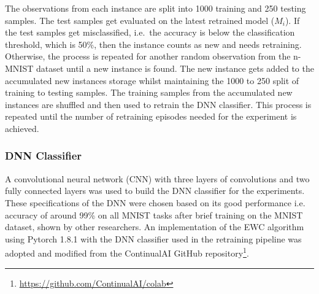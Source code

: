 The observations from each instance are split into 1000 training and 250 testing samples.
%
The test samples get evaluated on the latest retrained model ($M_i$).
%
If the test samples get misclassified, i.e.\ the accuracy is below the classification threshold, which is 50\%, then the instance counts as new and needs retraining. 
%
Otherwise, the process is repeated for another random observation from the n-MNIST dataset until a new instance is found.
%
The new instance gets added to the accumulated new instances storage whilst maintaining the 1000 to 250 split of training to testing samples. The training samples from the accumulated new instances are shuffled and then used to retrain the DNN classifier.
%
This process is repeated until the number of retraining episodes needed for the experiment is achieved.

\subsubsection{DNN Classifier}
A convolutional neural network (CNN) with three layers of convolutions and two fully connected layers was used to build the DNN classifier for the experiments. 
%
%
These specifications of the DNN were chosen based on its good performance i.e. accuracy of around 99\% on all MNIST tasks after brief training on the MNIST dataset, shown by other researchers.%
%
An implementation of the EWC algorithm using Pytorch 1.8.1 with the DNN classifier used in the retraining pipeline was adopted and modified from the ContinualAI GitHub repository\footnote{\url{https://github.com/ContinualAI/colab}}.
%

